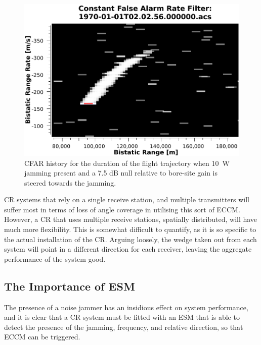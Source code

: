 \documentclass[conference]{IEEEtran}
\begin{document}
\begin{figure}[htbp]
\begin{center}
\includegraphics[width=1.0\columnwidth]{figs/Simulations/10WJammingNullSteeringCFAR.pdf}
\caption[CFAR history with null steered to jammer of 10~W.]{CFAR history for the duration of the flight trajectory when 10~W jamming present and a 7.5 dB null relative to bore-site gain is steered towards the jamming.}
\label{fig:10WJammingNullSteeringCFAR}
\end{center}
\end{figure}

\balance

CR systems that rely on a single receive station, and multiple transmitters will suffer most in terms of loss of angle coverage in utilising this sort of ECCM. However, a CR that uses multiple receive stations, spatially distributed, will have much more flexibility. This is somewhat difficult to quantify, as it is so specific to the actual installation of the CR. Arguing loosely, the wedge taken out from each system will point in a different direction for each receiver, leaving the aggregate performance of the system good. 
\subsection{The Importance of ESM}

The presence of a noise jammer has an insidious effect on system performance, and it is clear that a CR system must be fitted with an ESM that is able to detect the presence of the jamming, frequency, and relative direction, so that ECCM can be triggered.
\end{document}
